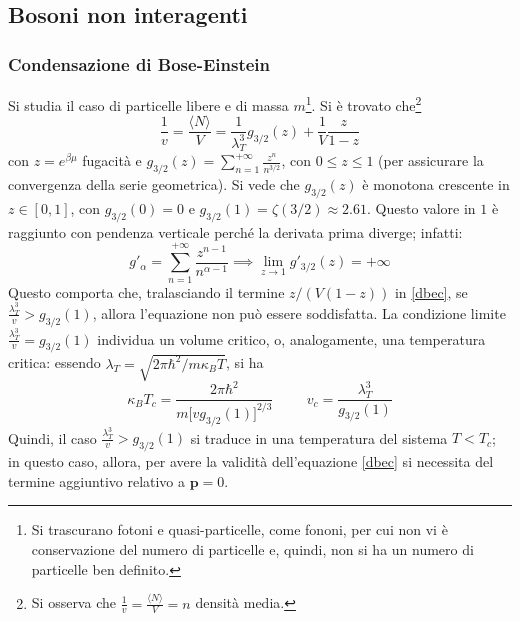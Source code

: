 \documentclass[11pt, a4paper]{scrartcl}
\theoremstyle{style}
\theoremstyle{style1}
\numberwithin{equation}{subsection}
\begin{document}
\subsection{Bosoni non interagenti}
\subsubsection{Condensazione di Bose-Einstein}

Si studia il caso di particelle libere e di massa $m$\footnote{Si trascurano fotoni e quasi-particelle, come fononi, per cui non vi \`e conservazione del numero di particelle e, quindi, non si ha un numero di particelle ben definito.}.
Si \`e trovato che\footnote{Si osserva che $\frac{1}{v} = \frac{\langle N \rangle}{V}= n$ densit\`a media.}
\begin{equation}\label{dbec}
\frac{1}{v} = \frac{\langle N \rangle}{V} = \frac{1}{\lambda _T ^3} g_{3 / 2}  (z) + \frac{1}{V} \frac{z}{1-z}
\end{equation}
con $z = e^{\beta \mu }$ fugacit\`a e $g_{3 / 2} (z) = \sum_{n=1}^{+\infty} \frac{z^n}{n^{3 / 2}}$, con $0\le z \le  1$ (per assicurare la convergenza della serie geometrica).
Si vede che $g_{3 / 2} (z)$ \`e monotona crescente in $z \in  \left[ 0,1 \right] $, con $g _{3 / 2} (0) = 0 $ e $g_{3 / 2} (1) = \zeta\left(3 / 2\right) \approx 2.61$.
Questo valore in $1$ \`e raggiunto con pendenza verticale perch\'e la derivata prima diverge; infatti:
\[
g'_\alpha  = \sum_{n=1}^{+\infty} \frac{z^{n-1}}{n^{\alpha -1}} \implies \lim_{z \to 1} g ' _{3 / 2} (z)= + \infty
\] 
Questo comporta che, tralasciando il termine $z / (V(1-z))$ in \ref{dbec}, se $\frac{\lambda _T^3}{v} > g_{3 / 2} (1)$, allora l'equazione non pu\`o essere soddisfatta.
La condizione limite $\frac{\lambda _T^3}{v} = g_{3 / 2} (1)$ individua un volume critico, o, analogamente, una temperatura critica: essendo $\lambda _T = \sqrt{2 \pi \hbar ^2 / m\kappa _B T} $, si ha
\[
	\kappa _B T_c = \frac{2\pi \hbar ^2}{m \Big[v g _{3 / 2} (1)\Big]^{2 / 3}} \hspace{1cm} v_c = \frac{\lambda _T ^3}{g_{3 / 2} (1)}
\] 
Quindi, il caso $\frac{\lambda _T^3}{v} > g_{3 / 2} (1)$ si traduce in una temperatura del sistema $T < T_c$; in questo caso, allora, per avere la validit\`a dell'equazione \ref{dbec} si necessita del termine aggiuntivo relativo a $\mathbf{p} =0$.
\end{document}
